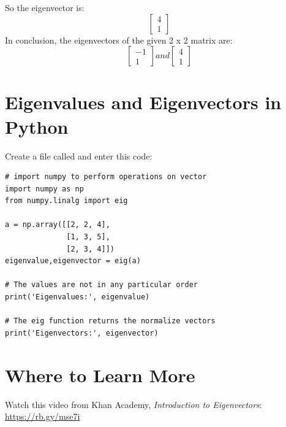 So the eigenvector is:
$$\begin{bmatrix}
4\\
1
\end{bmatrix}$$
In conclusion, the eigenvectors of the given 2 x 2 matrix are:
$$\begin{bmatrix}
-1\\
1
\end{bmatrix}
and \begin{bmatrix}
4\\
1
\end{bmatrix}$$

\section{Eigenvalues and Eigenvectors in Python}
Create a file called  and enter this code:

\begin{Verbatim}
# import numpy to perform operations on vector
import numpy as np
from numpy.linalg import eig

a = np.array([[2, 2, 4], 
              [1, 3, 5],
              [2, 3, 4]])
eigenvalue,eigenvector = eig(a)

# The values are not in any particular order
print('Eigenvalues:', eigenvalue)

# The eig function returns the normalize vectors
print('Eigenvectors:', eigenvector)

\end{Verbatim}

\section{Where to Learn More}
Watch this video from Khan Academy, \emph{Introduction to Eigenvectors}: \url{https://rb.gy/mse7i}
